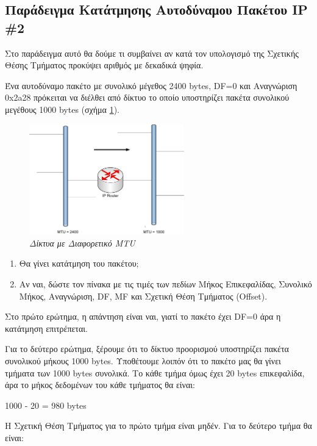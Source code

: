 \subsection*{Παράδειγμα Κατάτμησης Αυτοδύναμου Πακέτου IP \#2}

Στο παράδειγμα αυτό θα δούμε τι συμβαίνει αν κατά τον υπολογισμό της Σχετικής Θέσης Τμήματος προκύψει αριθμός με δεκαδικά ψηφία. 

Ένα αυτοδύναμο πακέτο με συνολικό μέγεθος 2400 bytes, DF=0 και Αναγνώριση 0x2a28 πρόκειται να διέλθει από δίκτυο το οποίο υποστηρίζει πακέτα συνολικού μεγέθους 1000 bytes (σχήμα \ref{3-9}).

\begin{figure}[!ht]
  \centering
  \includegraphics[width=0.60\textwidth]{images/chapter3/3-9}
  \caption {\textsl{Δίκτυα με Διαφορετικό MTU}}
  \label{3-9}
\end{figure} 

\begin{enumerate}
\item Θα γίνει κατάτμηση του πακέτου;
\item Αν ναι, δώστε τον πίνακα με τις τιμές των πεδίων Μήκος Επικεφαλίδας, Συνολικό Μήκος, Αναγνώριση, DF, MF και Σχετική Θέση Τμήματος (Offset).
\end{enumerate}

Στο πρώτο ερώτημα, η απάντηση είναι ναι, γιατί το πακέτο έχει DF=0 άρα η κατάτμηση επιτρέπεται.

Για το δεύτερο ερώτημα, ξέρουμε ότι το δίκτυο προορισμού υποστηρίζει πακέτα συνολικού μήκους 1000 bytes. Υποθέτουμε λοιπόν ότι το πακέτο μας θα γίνει τμήματα των 1000 bytes συνολικά. Το κάθε τμήμα όμως έχει 20 bytes επικεφαλίδα, άρα το μήκος δεδομένων του κάθε τμήματος θα είναι:

\begin{center}
1000 - 20 = 980 bytes
\end{center}

Η Σχετική Θέση Τμήματος για το πρώτο τμήμα είναι μηδέν. Για το δεύτερο τμήμα θα είναι:


